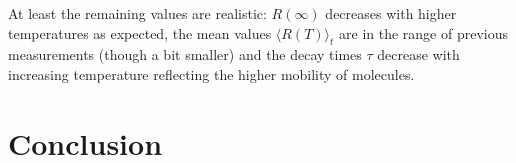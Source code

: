 \documentclass{scrartcl}
\numberwithin{equation}{section}
\numberwithin{figure}{section}
\numberwithin{table}{section}
\begin{document}
At least the remaining values are realistic: $R(\infty)$ decreases with higher temperatures as expected, the mean values $\langle R(T) \rangle_t$ are in the range of previous measurements (though a bit smaller) and the decay times $\tau$ decrease with increasing temperature reflecting the higher mobility of molecules.

\section{Conclusion}



\clearpage
 

\end{document}
